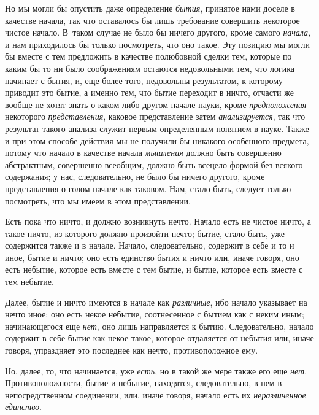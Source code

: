 Но мы могли бы опустить даже определение {\em бытия},
принятое нами доселе в качестве начала, так что оставалось бы лишь
требование совершить некоторое чистое начало. В~таком случае не было бы
ничего другого, кроме самого {\em начала}, и нам
приходилось бы только посмотреть, что оно такое. Эту позицию мы могли бы
вместе с тем предложить в качестве полюбовной сделки тем, которые по каким
бы то ни было соображениям остаются недовольными тем, что логика начинает с
бытия, и, еще более того, недовольны результатом, к которому приводит это
бытие, а именно тем, что бытие переходит в ничто, отчасти же вообще не
хотят знать о каком-либо другом начале науки, кроме
{\em предположения} некоторого
{\em представления}, каковое представление затем
{\em анализируется}, так что результат такого анализа
служит первым определенным понятием в науке. Также и при этом способе
действия мы не получили бы никакого особенного предмета, потому что начало
в качестве начала {\em мышления} должно быть совершенно
абстрактным, совершенно всеобщим, должно быть всецело формой без всякого
содержания; у нас, следовательно, не было бы ничего другого, кроме
представления о голом начале как таковом. Нам, стало быть, следует только
посмотреть, что мы имеем в этом представлении.

Есть пока что ничто, и должно возникнуть нечто. Начало есть не чистое ничто,
а такое ничто, из которого должно произойти нечто; бытие, стало быть, уже
содержится также и в начале. Начало, следовательно, содержит в себе и то и
иное, бытие и ничто; оно есть единство бытия и ничто или, иначе говоря,
оно есть небытие, которое есть вместе с тем бытие, и бытие, которое есть
вместе с тем небытие.

Далее, бытие и ничто имеются в начале как
{\em различные}, ибо начало указывает на нечто иное;
оно есть некое небытие, соотнесенное с бытием как с неким иным;
начинающегося еще {\em нет}, оно лишь направляется к
бытию. Следовательно, начало содержит в себе бытие как некое такое, которое
отдаляется от небытия или, иначе говоря, упраздняет это последнее как
нечто, противоположное ему.

Но, далее, то, что начинается, уже {\em есть}, но в
такой же мере также его еще {\em нет}.
Противоположности, бытие и небытие, находятся, следовательно, в нем в
непосредственном соединении, или, иначе говоря, начало есть их
{\em неразличенное единство}.

